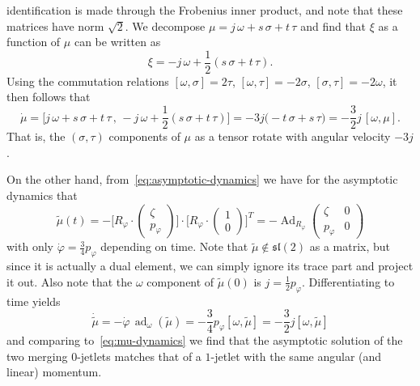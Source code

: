 \documentclass[12pt]{amsart}
\DeclareMathOperator{\Ad}{Ad}
\DeclareMathOperator{\ad}{ad}
\begin{document}
identification is made through the Frobenius inner product, and note
that these matrices have norm $\sqrt{2}$. We decompose
$\mu = j\,\omega + s\,\sigma + t\,\tau$ and find that $\xi$ as a
function of $\mu$ can be written as
\begin{equation*}
  \xi = -j\,\omega + \frac{1}{2}(s\,\sigma + t\,\tau).
\end{equation*}
Using the commutation relations $[\omega,\sigma] = 2\tau$,
$[\omega,\tau] = -2\sigma$, $[\sigma,\tau] = -2\omega$, it then
follows that
\begin{equation}\label{eq:mu-dynamics}
  \dot{\mu}
  = \big[j\,\omega+s\,\sigma+t\,\tau \,,\, -j\,\omega + \frac{1}{2}(s\,\sigma + t\,\tau)\big]
  = -3j\big(-t\,\sigma + s\,\tau\big)
  = -\frac{3}{2}j\,[\omega,\mu].
\end{equation}
That is, the $(\sigma,\tau)$ components of $\mu$ as a tensor rotate
with angular velocity $-3j$.

On the other hand, from~\eqref{eq:asymptotic-dynamics} we have for the
asymptotic dynamics that
\begin{equation*}
  \tilde{\mu}(t)
  = -\Big[R_\varphi \cdot \begin{pmatrix} \zeta \\ p_\varphi \end{pmatrix}\Big] \cdot
     \Big[R_\varphi \cdot \begin{pmatrix} 1   \\ 0         \end{pmatrix}\Big]^T
  = -\Ad_{R_\varphi} \begin{pmatrix} \zeta & 0 \\ p_\varphi & 0 \end{pmatrix}
\end{equation*}
with only $\dot{\varphi} = \frac{3}{4} p_\varphi$ depending on time.
Note that $\tilde{\mu} \not\in \mathfrak{sl}(2)$ as a matrix, but
since it is actually a dual element, we can simply ignore its trace
part and project it out. Also note that the $\omega$ component of
$\tilde{\mu}(0)$ is $j = \frac{1}{2}p_\varphi$. Differentiating to
time yields
\begin{equation*}
  \dot{\tilde{\mu}}
  = -\dot{\varphi}\,\ad_\omega(\tilde{\mu})
  = -\frac{3}{4} p_\varphi [\omega,\tilde{\mu}]
  = -\frac{3}{2} j [\omega,\tilde{\mu}]
\end{equation*}
and comparing to~\eqref{eq:mu-dynamics} we find that the asymptotic
solution of the two merging $0$-jetlets matches that of a $1$-jetlet
with the same angular (and linear) momentum.
\end{document}

